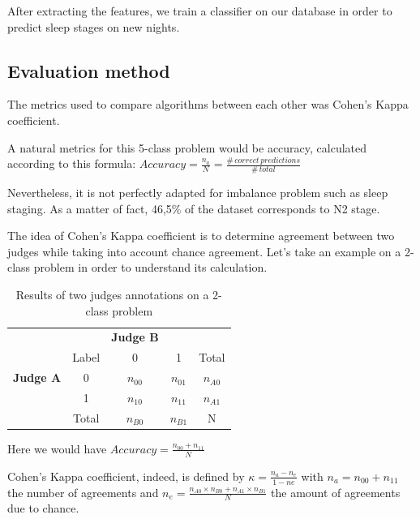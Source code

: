 \documentclass[12pt]{report}
\begin{document}
After extracting the features, we train a classifier on our database in order to predict sleep stages on new nights.

\subsection{Evaluation method}

The metrics used to compare algorithms between each other was Cohen's Kappa coefficient.

A natural metrics for this 5-class problem would be accuracy, calculated according to this formula: $Accuracy = \frac{n_a}{N} = \frac{\# \, correct \, predictions}{\# \, total}$

Nevertheless, it is not perfectly adapted for imbalance problem such as sleep staging. As a matter of fact, 46,5\% of the dataset corresponds to N2 stage.

The idea of Cohen's Kappa coefficient is to determine agreement between two judges while taking into account chance agreement. Let's take an example on a 2-class problem in order to understand its calculation.

\begin{table}[H]
\centering
\begin{tabular}{lcccc}
                                     & \multicolumn{1}{l}{}       & \textbf{Judge B} & \textbf{}                     & \multicolumn{1}{l}{} \\
                                     & \multicolumn{1}{c|}{Label} & 0                & \multicolumn{1}{c|}{1}        & Total                \\ \cline{2-5} 
\multicolumn{1}{c}{\textbf{Judge A}} & \multicolumn{1}{c|}{0}     & $n_{00}$         & \multicolumn{1}{c|}{$n_{01}$} & $n_{A0}$             \\
\multicolumn{1}{c}{\textbf{}}        & \multicolumn{1}{c|}{1}     & $n_{10}$         & \multicolumn{1}{c|}{$n_{11}$} & $n_{A1}$             \\ \cline{2-5} 
                                     & \multicolumn{1}{c|}{Total} & $n_{B0}$         & \multicolumn{1}{c|}{$n_{B1}$} & N                   
\end{tabular}
\caption{\label{tab:kappa_judges}Results of two judges annotations on a 2-class problem}
\end{table}

Here we would have $Accuracy = \frac{n_{00}+n_{11}}{N}$

Cohen's Kappa coefficient, indeed, is defined by $\kappa=\frac{n_a-n_e}{1-ne}$ with $n_a=n_{00}+n_{11}$ the number of agreements and $n_e = \frac{n_{A0} \times n_{B0} + n_{A1} \times n_{B1}}{N}$ the amount of agreements due to chance.
\end{document}
